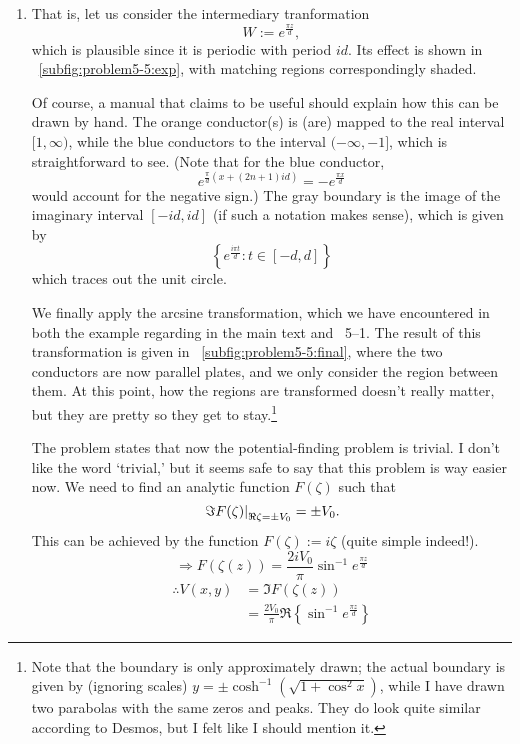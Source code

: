 \begin{enumerate}[wide, labelindent = 0pt, label = (\alph*)]
\item
{}
That is, let us consider the intermediary tranformation
\[
    W := e^{\frac{\pi z}{d}},
\]
which is plausible since it is periodic with period $id$.
Its effect is shown in ~\ref{subfig:problem5-5:exp},
with matching regions correspondingly shaded.

Of course, a manual that claims to be useful should explain how this can be drawn by hand.
The orange conductor(s) is (are) mapped to the real interval $[1, \infty)$,
while the blue conductors to the interval $(-\infty, -1]$,
which is straightforward to see.
(Note that for the blue conductor,
\[
    e^{\frac{\pi}{d}(x + (2n+1)id)} = -e^{\frac{\pi x}{d}}
\]
would account for the negative sign.)
The gray boundary is the image of the imaginary interval $[-id, id]$
(if such a notation makes sense), which is given by
\[
    \left\{ e^{\frac{i\pi t}{d}} : t \in [-d, d] \right\}
\]
which traces out the unit circle.

We finally apply the arcsine transformation, which we have encountered in both
the example regarding  in the main text and ~5--1.
The result of this transformation is given in ~\ref{subfig:problem5-5:final},
where the two conductors are now parallel plates, and we only consider the region between them.
At this point, how the regions are transformed doesn't really matter,
but they are pretty so they get to stay.\footnote{%
Note that the boundary is only approximately drawn;
the actual boundary is given by (ignoring scales)
$y = \pm \cosh^{-1}\left( \sqrt{1 + \cos^2 x} \right)$,
while I have drawn two parabolas with the same zeros and peaks.
They do look quite similar according to Desmos, but I felt like I should mention it.
}

The problem states that now the potential-finding problem is trivial.
I don't like the word `trivial,' but it seems safe to say that this problem is way easier now.
We need to find an analytic function $F(\zeta)$ such that
\[
    {\left. \Im F(\zeta) \right|}_{\Re \zeta = \pm V_0} = \pm V_0.
\]
This can be achieved by the function $F(\zeta) := i\zeta$ (quite simple indeed!).
\[
    \Rightarrow F(\zeta(z))
    = \frac{2iV_0}{\pi} \sin^{-1} e^{\frac{\pi z}{d}}
\]
\begin{align*}
    \therefore V(x, y)
    &= \Im F(\zeta(z)) \\
    &= \frac{2V_0}{\pi} \Re\left\{ \sin^{-1} e^{\frac{\pi z}{d}} \right\}
\end{align*}


\end{enumerate}
